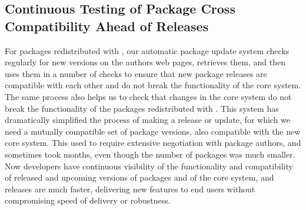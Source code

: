 \subsection{Continuous Testing of Package Cross Compatibility Ahead of
\GAP Releases}\label{pkg-update}
For packages redistributed with \GAP, our automatic package update system
checks regularly for new versions on the authors web pages, retrieves them, and then uses them in a
number of checks to ensure that new package releases are compatible with
each other and do not break the functionality of the core \GAP system. The
same process also helps us to check that changes in the core \GAP system
do not break the functionality of the packages redistributed with \GAP.
This system has dramatically simplified the process of making a \GAP
release or update, for which we need a mutually compatible set of
package versions, also compatible with the new core system. This used
to require extensive negotiation with package authors, and sometimes
took months, even though the number of packages was much smaller. Now
developers have continuous visibility of the functionality and
compatibility of released and upcoming versions of packages and of the
core system, and releases are much faster, delivering new features to
end users without compromising speed of delivery or robustness.


